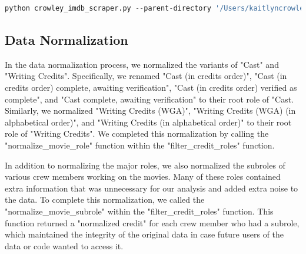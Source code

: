 \documentclass[12pt]{article}
\begin{document}
\begin{lstlisting}[language=Python, caption=Running code in terminal example., label=lst:terminalInputs]
python crowley_imdb_scraper.py --parent-directory '/Users/kaitlyncrowley/Desktop/Spring2024/DATA445/FinalProject/film_directors/' --director-data-path '/Users/kaitlyncrowley/Desktop/Spring2024/DATA445/FinalProject/100_film_directors.csv' --director-id-input nm0336620,nm0000229
\end{lstlisting}

\subsection*{Data Normalization}
In the data normalization process, we normalized the variants of "Cast" and "Writing Credits". Specifically, we renamed "Cast (in credits order)", "Cast (in credits order) complete, awaiting verification", "Cast (in credits order) verified as complete", and "Cast complete, awaiting verification" to their root role of "Cast. Similarly, we normalized "Writing Credits (WGA)", "Writing Credits (WGA) (in alphabetical order)", and "Writing Credits (in alphabetical order)" to their root role of "Writing Credits". We completed this normalization by calling the "normalize\_movie\_role" function within the "filter\_credit\_roles" function. 
\par
In addition to normalizing the major roles, we also normalized the subroles of various crew members working on the movies. Many of these roles contained extra information that was unnecessary for our analysis and added extra noise to the data. To complete this normalization, we called the "normalize\_movie\_subrole" within the "filter\_credit\_roles" function. This function returned a "normalized credit" for each crew member who had a subrole, which maintained the integrity of the original data in case future users of the data or code wanted to access it.
\end{document}
